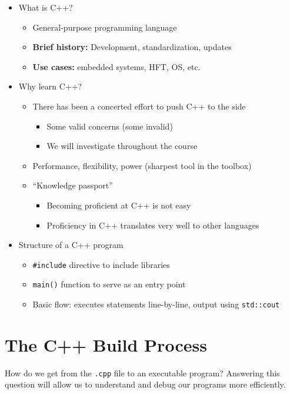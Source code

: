 \documentclass{article}
\begin{document}
\begin{itemize}
	\item What is C++? \begin{itemize}
		\item General-purpose programming language
		\item \textbf{Brief history:} Development, standardization, updates
		\item \textbf{Use cases:} embedded systems, HFT, OS, etc.
	\end{itemize}
	\item Why learn C++? \begin{itemize}
		\item There has been a concerted effort to push C++ to the side \begin{itemize}
			\item Some valid concerns (some invalid)
			\item We will investigate throughout the course
		\end{itemize}
		\item Performance, flexibility, power (sharpest tool in the toolbox)
		\item ``Knowledge passport'' \begin{itemize}
			\item Becoming proficient at C++ is not easy
			\item Proficiency in C++ translates very well to other languages
		\end{itemize}
	\end{itemize}
	\item Structure of a C++ program
	
	\begin{itemize}
		\item \texttt{\#include} directive to include libraries
		\item \texttt{main()} function to serve as an entry point
		\item Basic flow: executes statements line-by-line, output using \texttt{std::cout}
	\end{itemize}
\end{itemize}

\section{The C++ Build Process}

\noindent
How do we get from the \texttt{.cpp} file to an executable program? Answering this question will allow us to understand and debug our programs more efficiently.
\end{document}
